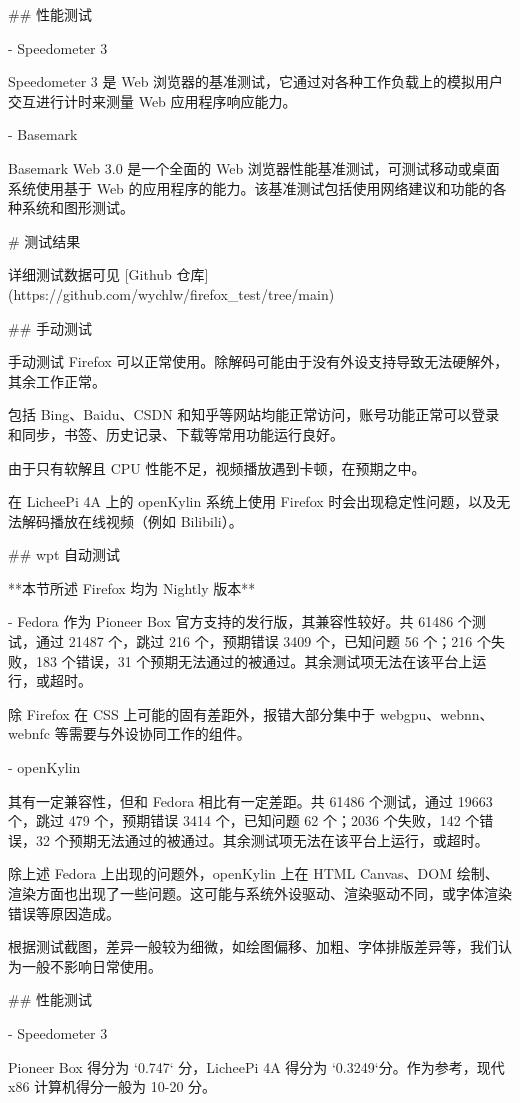 \documentclass{article}
\begin{document}
\begin{markdown}
## 性能测试

- Speedometer 3

Speedometer 3 是 Web 浏览器的基准测试，它通过对各种工作负载上的模拟用户交互进行计时来测量 Web 应用程序响应能力。

- Basemark

Basemark Web 3.0 是一个全面的 Web 浏览器性能基准测试，可测试移动或桌面系统使用基于 Web 的应用程序的能力。该基准测试包括使用网络建议和功能的各种系统和图形测试。

# 测试结果

详细测试数据可见 [Github 仓库](https://github.com/wychlw/firefox_test/tree/main)

## 手动测试

手动测试 Firefox 可以正常使用。除解码可能由于没有外设支持导致无法硬解外，其余工作正常。

包括 Bing、Baidu、CSDN 和知乎等网站均能正常访问，账号功能正常可以登录和同步，书签、历史记录、下载等常用功能运行良好。

由于只有软解且 CPU 性能不足，视频播放遇到卡顿，在预期之中。

在 LicheePi 4A 上的 openKylin 系统上使用 Firefox 时会出现稳定性问题，以及无法解码播放在线视频（例如 Bilibili）。

## wpt 自动测试

**本节所述 Firefox 均为 Nightly 版本**

- Fedora
作为 Pioneer Box 官方支持的发行版，其兼容性较好。共 61486 个测试，通过 21487 个，跳过 216 个，预期错误 3409 个，已知问题 56 个；216 个失败，183 个错误，31 个预期无法通过的被通过。其余测试项无法在该平台上运行，或超时。

除 Firefox 在 CSS 上可能的固有差距外，报错大部分集中于 webgpu、webnn、webnfc 等需要与外设协同工作的组件。

- openKylin

其有一定兼容性，但和 Fedora 相比有一定差距。共 61486 个测试，通过 19663 个，跳过 479 个，预期错误 3414 个，已知问题 62 个；2036 个失败，142 个错误，32 个预期无法通过的被通过。其余测试项无法在该平台上运行，或超时。

除上述 Fedora 上出现的问题外，openKylin 上在 HTML Canvas、DOM 绘制、渲染方面也出现了一些问题。这可能与系统外设驱动、渲染驱动不同，或字体渲染错误等原因造成。

根据测试截图，差异一般较为细微，如绘图偏移、加粗、字体排版差异等，我们认为一般不影响日常使用。

## 性能测试

- Speedometer 3

Pioneer Box 得分为 `0.747` 分，LicheePi 4A 得分为 `0.3249`分。作为参考，现代 x86 计算机得分一般为 10-20 分。


\end{markdown}
\end{document}
